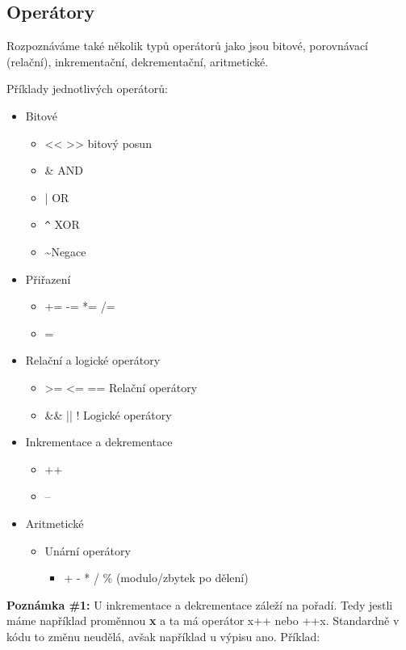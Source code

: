 \documentclass[twoside,a4paper]{article} %
\begin{document}
\subsection{Operátory}
Rozpoznáváme také několik typů operátorů jako jsou bitové, porovnávací (relační), inkrementační, dekrementační, aritmetické.

Příklady jednotlivých operátorů:
\begin{itemize}
    \item Bitové
    \begin{itemize}
        \item << >> bitový posun
        \item \& AND
        \item | OR
        \item \texttt{\^{}} XOR
        \item \textasciitilde Negace
    \end{itemize}
    \item Přiřazení
    \begin{itemize}
        \item += -= *= /=
        \item =
    \end{itemize}
    \item Relační a logické operátory
    \begin{itemize}
        \item < > >= <= == Relační operátory
        \item \&\& || ! Logické operátory
    \end{itemize}
    \item Inkrementace a dekrementace
    \begin{itemize}
        \item ++ 
        \item --
    \end{itemize}
    \item Aritmetické
    \begin{itemize}
        \item Unární operátory
        \begin{itemize}
            \item + - * / \% (modulo/zbytek po dělení)
        \end{itemize}
    \end{itemize}
\end{itemize}

\textbf{Poznámka \#1:} U inkrementace a dekrementace záleží na pořadí. Tedy jestli máme například proměnnou \textbf{x} a ta má operátor x++ nebo ++x. Standardně v kódu to změnu neudělá, avšak například u výpisu ano. Příklad:
\end{document}
